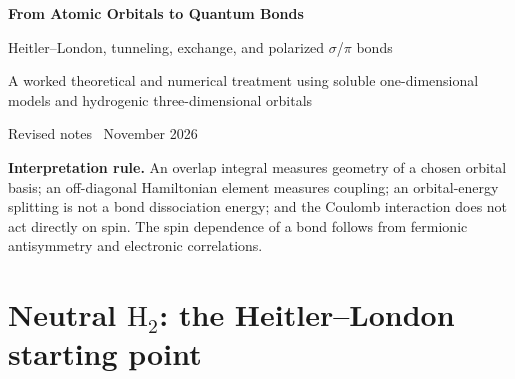 \documentclass[11pt,letterpaper]{article}
\newcommand{\highlight}[1]{\par\smallskip\noindent\colorbox{pale}{\parbox{0.956\linewidth}{\strut #1\strut}}\smallskip\par}
\begin{document}
\begin{center}
{\fontsize{22}{27}\selectfont\bfseries From Atomic Orbitals to Quantum Bonds}\par\vspace{6pt}
{\Large Heitler--London, tunneling, exchange, and polarized $\sigma$/$\pi$ bonds}\par\vspace{8pt}
{\small A worked theoretical and numerical treatment using soluble one-dimensional models and hydrogenic three-dimensional orbitals}\par\vspace{6pt}
{\small Revised notes \textbullet\ November 2026}
\end{center}
\vspace{8pt}
\begin{abstract}
Starting with neutral $\mathrm H_2$, we formulate the fermionic Heitler--London ansatz, separate spatial exchange from spin symmetry, and distinguish a variational configuration-space diagonalization from controlled degenerate perturbation theory. A two-position model clarifies why wavefunction overlap is not hopping. The one-electron $\mathrm H_2^+$ Coulomb problem and a solvable one-dimensional double-delta potential then provide explicit, distance-dependent hopping amplitudes through the identity $H_{ab}=\langle a\lvert H_B+V_A\rvert b\rangle$. A normalized Gaussian trial basis gives a separate worked variational calculation for \emph{the same} delta-well Hamiltonian. The interacting Hubbard dimer isolates singlet--triplet superexchange. Finally, normalized hydrogenic $2s$/$2p$ functions support quantitative two-center $sp^3$--$sp^3$ $\sigma$ and $p$--$p$ $\pi$ examples ($Z=1$), followed by model C--O ($Z_{\rm eff,C}=3.25$, $Z_{\rm eff,O}=4.55$) and C--H ($sp^3$--$1s$) bonds. Extended integrals and numerical methods are collected in appendices.
\end{abstract}
\tableofcontents
\vspace{0.6em}
\highlight{\textbf{Interpretation rule.} An overlap integral measures geometry of a chosen orbital basis; an off-diagonal Hamiltonian element measures coupling; an orbital-energy splitting is not a bond dissociation energy; and the Coulomb interaction does not act directly on spin. The spin dependence of a bond follows from fermionic antisymmetry and electronic correlations.}

\section{Neutral $\mathrm H_2$: the Heitler--London starting point}
\end{document}
